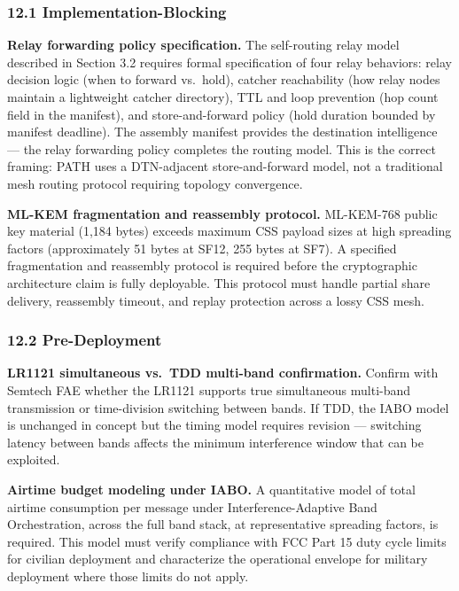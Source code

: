 \documentclass[
  11pt,
]{article}
\begin{document}
\hypertarget{implementation-blocking}{%
\subsubsection{12.1
Implementation-Blocking}\label{implementation-blocking}}

\textbf{Relay forwarding policy specification.} The self-routing relay
model described in Section 3.2 requires formal specification of four
relay behaviors: relay decision logic (when to forward vs.~hold),
catcher reachability (how relay nodes maintain a lightweight catcher
directory), TTL and loop prevention (hop count field in the manifest),
and store-and-forward policy (hold duration bounded by manifest
deadline). The assembly manifest provides the destination intelligence
--- the relay forwarding policy completes the routing model. This is the
correct framing: PATH uses a DTN-adjacent store-and-forward model, not a
traditional mesh routing protocol requiring topology convergence.

\textbf{ML-KEM fragmentation and reassembly protocol.} ML-KEM-768 public
key material (1,184 bytes) exceeds maximum CSS payload sizes at high
spreading factors (approximately 51 bytes at SF12, 255 bytes at SF7). A
specified fragmentation and reassembly protocol is required before the
cryptographic architecture claim is fully deployable. This protocol must
handle partial share delivery, reassembly timeout, and replay protection
across a lossy CSS mesh.

\hypertarget{pre-deployment}{%
\subsubsection{12.2 Pre-Deployment}\label{pre-deployment}}

\textbf{LR1121 simultaneous vs.~TDD multi-band confirmation.} Confirm
with Semtech FAE whether the LR1121 supports true simultaneous
multi-band transmission or time-division switching between bands. If
TDD, the IABO model is unchanged in concept but the timing model
requires revision --- switching latency between bands affects the
minimum interference window that can be exploited.

\textbf{Airtime budget modeling under IABO.} A quantitative model of
total airtime consumption per message under Interference-Adaptive Band
Orchestration, across the full band stack, at representative spreading
factors, is required. This model must verify compliance with FCC Part 15
duty cycle limits for civilian deployment and characterize the
operational envelope for military deployment where those limits do not
apply.
\end{document}

